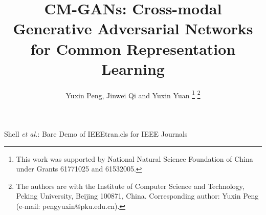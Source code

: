 \documentclass[journal]{IEEEtran}
\begin{document}
%
\title{CM-GANs: Cross-modal Generative Adversarial Networks for Common Representation Learning}
%
%
%

\author{Yuxin Peng, Jinwei Qi and Yuxin Yuan
	\thanks{This work was supported by National Natural Science Foundation of China under Grants 61771025 and 61532005.}
	\thanks{The authors are with the Institute of Computer Science and Technology,	Peking University, Beijing 100871, China. Corresponding author: Yuxin Peng	(e-mail: pengyuxin@pku.edu.cn).}
}
% 
%



%
{Shell \MakeLowercase{\textit{et al.}}: Bare Demo of IEEEtran.cls for IEEE Journals}
% 
\end{document}
